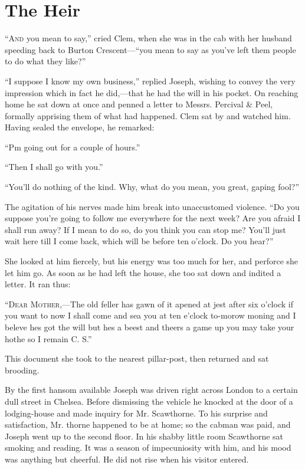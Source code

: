 \chapter{The Heir}

\textsc{``And} you mean to say,'' cried Clem, when she was in the cab
with her husband speeding back to Burton Crescent---``you mean to say as
you've left them people to do what they like?''

``I suppose I know my own business,'' replied Joseph, wishing to convey
the very impression which in fact he did,---that he had the will in his
pocket. On reaching home he sat down at once and penned a letter to
Messrs. Percival \& Peel, formally apprising them of what had happened.
Clem sat by and watched him. Having sealed the envelope, he remarked:

``Pm going out for a couple of hours.''

``Then I shall go with you.''

``You'll do nothing of the kind. Why, what do you mean, you great,
gaping fool?''

The agitation of his nerves made him break {}into unaccustomed violence.
``Do you suppose you're going to follow me everywhere for the next week?
Are you afraid I shall run away? If I mean to do so, do you think you
can stop me? You'll just wait here till I come back, which will be
before ten o'clock. Do you hear?''

She looked at him fiercely, but his energy was too much for her, and
perforce she let him go. As soon as he had left the house, she too sat
down and indited a letter. It ran thus:

``\textsc{Dear Mother},---The old feller has gawn of it apened at jest
after six o'clock if you want to now I shall come and sea you at ten
e'clock to-morow moning and I beleve hes got the will but hes a beest
and theers a game up you may take your hothe so I remain C. S.''

This document she took to the nearest pillar-post, then returned and sat
brooding.

By the first hansom available Joseph was driven right across London to a
certain dull street in Chelsea. Before dismissing the vehicle he knocked
at the door of a lodging-house and made inquiry for Mr. Scawthorne. To
his surprise and satisfaction, Mr. {}thorne happened to be at home; so
the cabman was paid, and Joseph went up to the second floor. In his
shabby little room Scawthorne sat smoking and reading. It was a season
of impecuniosity with him, and his mood was anything but cheerful. He
did not rise when his visitor entered.

